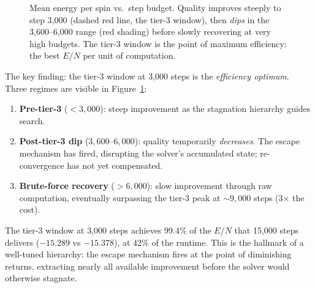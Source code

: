 \documentclass[11pt,a4paper]{article}
\begin{document}
\begin{figure}[H]
\centering
{}
\caption{Mean energy per spin vs.\ step budget. Quality improves steeply to step 3{,}000 (dashed red line, the tier-3 window), then \emph{dips} in the 3{,}600--6{,}000 range (red shading) before slowly recovering at very high budgets. The tier-3 window is the point of maximum efficiency: the best $E/N$ per unit of computation.}
\label{fig:stag_sweep}
\end{figure}

\noindent The key finding: the tier-3 window at 3{,}000 steps is the \emph{efficiency optimum}.
Three regimes are visible in Figure~\ref{fig:stag_sweep}:
\begin{enumerate}[nosep]
\item \textbf{Pre-tier-3} ($< 3{,}000$): steep improvement as the stagnation hierarchy guides search.
\item \textbf{Post-tier-3 dip} ($3{,}600$--$6{,}000$): quality temporarily \emph{decreases}. The escape mechanism has fired, disrupting the solver's accumulated state; re-convergence has not yet compensated.
\item \textbf{Brute-force recovery} ($> 6{,}000$): slow improvement through raw computation, eventually surpassing the tier-3 peak at $\sim 9{,}000$ steps (3$\times$ the cost).
\end{enumerate}
The tier-3 window at 3{,}000 steps achieves 99.4\% of the $E/N$ that 15{,}000 steps delivers ($-15.289$ vs $-15.378$), at 42\% of the runtime.
This is the hallmark of a well-tuned hierarchy: the escape mechanism fires at the point of diminishing returns, extracting nearly all available improvement before the solver would otherwise stagnate.
\end{document}
